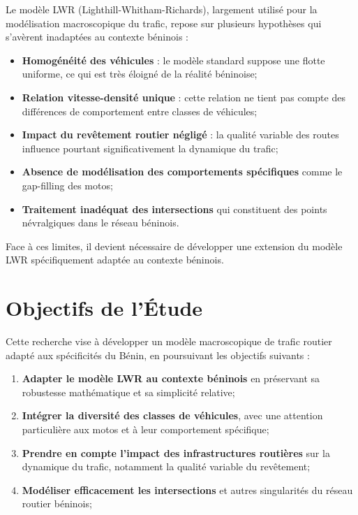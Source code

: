 Le modèle LWR (Lighthill-Whitham-Richards), largement utilisé pour la modélisation macroscopique du trafic, repose sur plusieurs hypothèses qui s'avèrent inadaptées au contexte béninois :

\begin{itemize}
\item \textbf{Homogénéité des véhicules} : le modèle standard suppose une flotte uniforme, ce qui est très éloigné de la réalité béninoise;
\item \textbf{Relation vitesse-densité unique} : cette relation ne tient pas compte des différences de comportement entre classes de véhicules;
\item \textbf{Impact du revêtement routier négligé} : la qualité variable des routes influence pourtant significativement la dynamique du trafic;
\item \textbf{Absence de modélisation des comportements spécifiques} comme le gap-filling des motos;
\item \textbf{Traitement inadéquat des intersections} qui constituent des points névralgiques dans le réseau béninois.
\end{itemize}

Face à ces limites, il devient nécessaire de développer une extension du modèle LWR spécifiquement adaptée au contexte béninois.

\section{Objectifs de l'Étude}
\label{sec:objectifs}

Cette recherche vise à développer un modèle macroscopique de trafic routier adapté aux spécificités du Bénin, en poursuivant les objectifs suivants :

\begin{enumerate}
\item \textbf{Adapter le modèle LWR au contexte béninois} en préservant sa robustesse mathématique et sa simplicité relative;
\item \textbf{Intégrer la diversité des classes de véhicules}, avec une attention particulière aux motos et à leur comportement spécifique;
\item \textbf{Prendre en compte l'impact des infrastructures routières} sur la dynamique du trafic, notamment la qualité variable du revêtement;
\item \textbf{Modéliser efficacement les intersections} et autres singularités du réseau routier béninois;
\end{enumerate}

